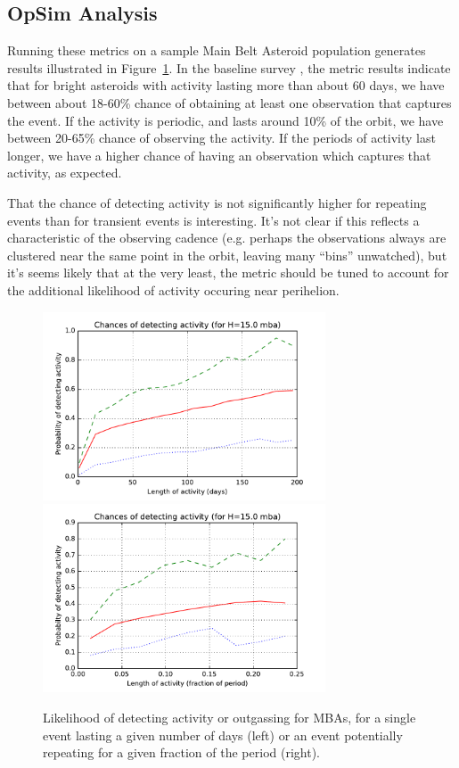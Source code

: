 
\subsection{OpSim Analysis}
\label{sec:\secname:analysis}

Running these metrics on a sample Main Belt Asteroid population
generates results illustrated in Figure~\ref{activity}.
In the baseline survey , the metric results
indicate that for bright asteroids with activity lasting more than
about 60 days, we have between about 18-60\% chance of obtaining at
least one observation that captures the event. If the activity is
periodic, and lasts around 10\% of the orbit, we have between
20-65\% chance of observing the activity. If the periods of activity
last longer, we have a higher chance of having an observation which
captures that activity, as expected.

That the chance of detecting activity is not significantly higher for
repeating events than for transient events is interesting. It's not
clear if this reflects a characteristic of the observing cadence
(e.g. perhaps the observations always are clustered near the same
point in the orbit, leaving many ``bins'' unwatched), but it's seems
likely that at  the very least, the metric should be tuned to account for the additional
likelihood of activity occuring near perihelion.

\begin{figure}
\includegraphics[width=3.3in]{figs/solarsystem/minion_1016_mba_Activity_time}
\includegraphics[width=3.3in]{figs/solarsystem/minion_1016_mba_Activity_period}
\caption{Likelihood of detecting activity or outgassing for MBAs, for
  a single event lasting a given number of days (left) or an event
  potentially repeating for a given fraction of the period (right).
\label{activity}}
\end{figure}


